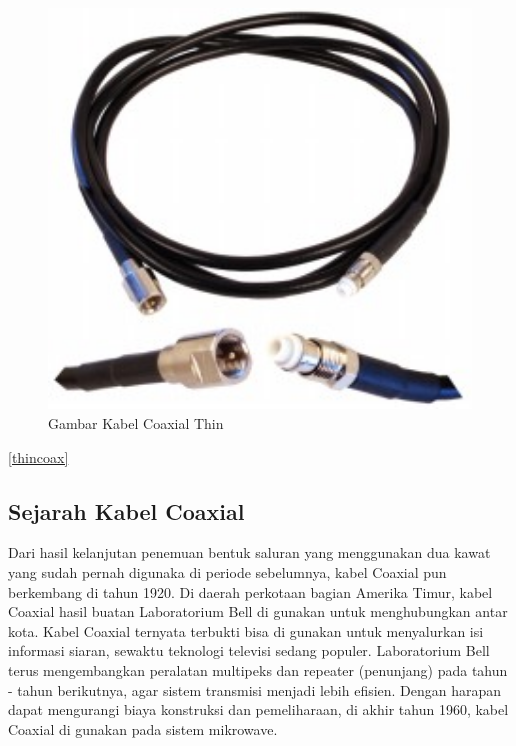 \begin{itemize}
{\begin{itemize}
\begin{itemize}
\begin{figure} [ht]
	\centerline{\includegraphics[width=1\textwidth]{figures/thincoax.jpg}}
	\caption{Gambar Kabel Coaxial Thin}
	\label{thickcoax}
\end{figure}

\ref{thincoax}

	\subsection{Sejarah Kabel Coaxial}
	Dari hasil kelanjutan penemuan bentuk saluran yang menggunakan dua kawat yang sudah pernah digunaka di periode sebelumnya, kabel Coaxial pun berkembang di tahun 1920. Di daerah perkotaan bagian Amerika Timur, kabel Coaxial hasil buatan Laboratorium Bell di gunakan untuk menghubungkan antar kota. Kabel Coaxial ternyata terbukti bisa di gunakan untuk menyalurkan isi informasi siaran, sewaktu teknologi televisi sedang populer. Laboratorium Bell terus mengembangkan peralatan multipeks dan repeater (penunjang) pada tahun - tahun berikutnya, agar sistem transmisi menjadi lebih efisien. Dengan harapan dapat mengurangi biaya konstruksi dan pemeliharaan, di akhir tahun 1960, kabel Coaxial di gunakan pada sistem mikrowave.
	

\end{itemize}
\end{itemize}}
\end{itemize}
